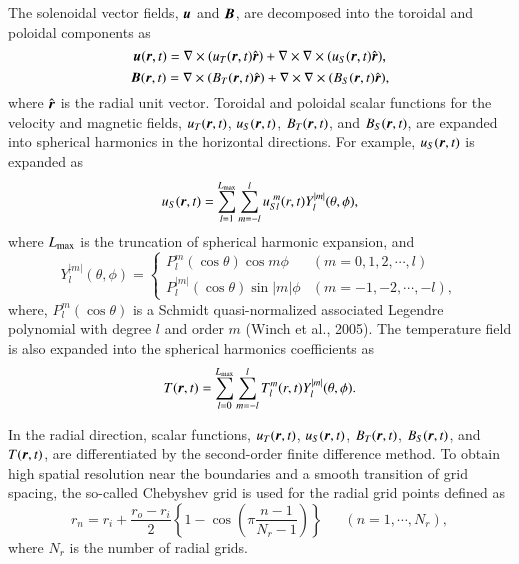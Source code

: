 The solenoidal vector fields, $\mbox{\boldmath$u$}$ and $\mbox{\boldmath$B$}$, are decomposed into the toroidal and poloidal components as
%
\begin{equation}
    \mbox{\boldmath$u$} (\mbox{\boldmath$r$}, t) = \nabla \times ( u_T (\mbox{\boldmath$r$}, t) \hat{\mbox{\boldmath$r$}} ) + \nabla \times \nabla \times ( u_S (\mbox{\boldmath$r$}, t) \hat{\mbox{\boldmath$r$}} ),
\label{eq:uT_uS}
\end{equation}
%
\begin{equation}
    \mbox{\boldmath$B$} (\mbox{\boldmath$r$}, t) = \nabla \times ( B_T (\mbox{\boldmath$r$}, t) \hat{\mbox{\boldmath$r$}} ) + \nabla \times \nabla \times ( B_S (\mbox{\boldmath$r$}, t) \hat{\mbox{\boldmath$r$}} ),
\label{eq:BT_BS}
\end{equation}
%
where $\hat{\mbox{\boldmath$r$}}$ is the radial unit vector.
Toroidal and poloidal scalar functions for the velocity and magnetic fields, $u_T (\mbox{\boldmath$r$}, t)$, $u_S (\mbox{\boldmath$r$}, t)$, $B_T (\mbox{\boldmath$r$}, t)$, and $B_S (\mbox{\boldmath$r$}, t)$, 
are expanded into spherical harmonics in the horizontal directions. For example, $u_{S} (\mbox{\boldmath$r$}, t)$ is expanded as
%
\begin{equation}
    u_{S} (\mbox{\boldmath$r$}, t) = \sum_{l=1}^{L_{\rm max}} \sum_{m=-l}^{l} u_{Sl}^{\ m} (r, t) Y_l^{|m|} (\theta, \phi),
\label{eq:Us_expansion}
\end{equation}
%
where $L_{\rm max}$ is the truncation of spherical harmonic expansion, and
%
\begin{equation}
Y_l^{|m|} (\theta, \phi) = \left\{
 \begin{array}{ll}
 P_l^m(\cos\theta)\cos m\phi & (m = 0, 1, 2, \cdots, l)
 \\
 P_l^{|m|}(\cos\theta)\sin |m|\phi & (m = -1, -2, \cdots, -l) ,
 \end{array}
\right.
\label{eq:def_of_Ylm}
\end{equation}
%
where, $P_l^m (\cos \theta )$ is a Schmidt quasi-normalized associated Legendre polynomial with degree $l$ and order $m$ (Winch et al., 2005). 
The temperature field is also expanded into the spherical harmonics coefficients as 
%
\begin{equation}
    T(\mbox{\boldmath$r$}, t) = \sum_{l=0}^{L_{\rm max}} \sum_{m=-l}^{l} T_l^m (r, t) Y_l^{|m|} (\theta, \phi).
\label{eq:T_expansion}
\end{equation}
%

In the radial direction, scalar functions, $u_T (\mbox{\boldmath$r$}, t)$, $u_S (\mbox{\boldmath$r$}, t)$, $B_T (\mbox{\boldmath$r$}, t)$, $B_S (\mbox{\boldmath$r$}, t)$, and $T(\mbox{\boldmath$r$}, t)$, are differentiated by the second-order finite difference method. 
To obtain high spatial resolution near the boundaries and a smooth transition of grid spacing, the so-called Chebyshev grid is used for the radial grid points defined as
%
\begin{equation}
r_n = r_i + \frac{r_o - r_i}{2} \left\{ 1 - \cos \left( \pi \frac{n-1}{N_r-1} \right) \right\} ~~\;\;\;\; (n = 1, \cdots , N_r) ,
\label{eq:def_of_rn}
\end{equation}
%
where $N_r$ is the number of radial grids.

